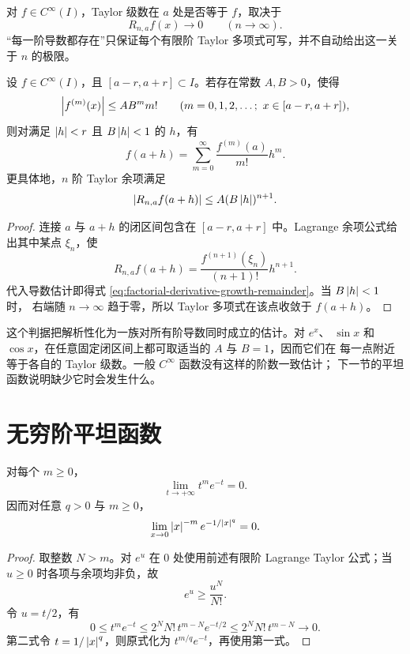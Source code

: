 对 \(f\in C^\infty(I)\)，Taylor 级数在 \(a\) 处是否等于 \(f\)，取决于
\[
 R_{n,a}f(x)\longrightarrow0\qquad(n\to\infty).
\]
“每一阶导数都存在”只保证每个有限阶 Taylor 多项式可写，并不自动给出这一关于 \(n\) 的极限。

\begin{theorem}[导数增长与解析性]
\label{thm:derivative-growth-analyticity}
设 \(f\in C^\infty(I)\)，且 \([a-r,a+r]\subset I\)。若存在常数 \(A,B>0\)，使得
\[
 \left|f^{(m)}(x)\right|\le A B^m m!
 \qquad(m=0,1,2,\ldots;\ x\in[a-r,a+r]),
\]
则对满足 \(\left|h\right|<r\) 且 \(B\left|h\right|<1\) 的 \(h\)，有
\[
 f(a+h)=\sum_{m=0}^{\infty}\frac{f^{(m)}(a)}{m!}h^m.
\]
更具体地，\(n\) 阶 Taylor 余项满足
\begin{equation}
 \left|R_{n,a}f(a+h)\right|\le A(B\left|h\right|)^{n+1}.
 \label{eq:factorial-derivative-growth-remainder}
\end{equation}
\end{theorem}

\begin{proof}
连接 \(a\) 与 \(a+h\) 的闭区间包含在 \([a-r,a+r]\) 中。Lagrange 余项公式给出其中某点
\(\xi_n\)，使
\[
 R_{n,a}f(a+h)=\frac{f^{(n+1)}(\xi_n)}{(n+1)!}h^{n+1}.
\]
代入导数估计即得式 \eqref{eq:factorial-derivative-growth-remainder}。当 \(B\left|h\right|<1\) 时，
右端随 \(n\to\infty\) 趋于零，所以 Taylor 多项式在该点收敛于 \(f(a+h)\)。
\end{proof}

这个判据把解析性化为一族对所有阶导数同时成立的估计。对 \(e^x\)、
\(\sin x\) 和 \(\cos x\)，在任意固定闭区间上都可取适当的 \(A\) 与 \(B=1\)，因而它们在
每一点附近等于各自的 Taylor 级数。一般 \(C^\infty\) 函数没有这样的阶数一致估计；
下一节的平坦函数说明缺少它时会发生什么。

\section{无穷阶平坦函数}

\begin{lemma}[指数压过任意幂]
对每个 \(m\ge0\)，
\[
 \lim_{t\to+\infty}t^m e^{-t}=0.
\]
因而对任意 \(q>0\) 与 \(m\ge0\)，
\[
 \lim_{x\to0}\left|x\right|^{-m}e^{-1/\left|x\right|^{q}}=0.
\]
\end{lemma}

\begin{proof}
取整数 \(N>m\)。对 \(e^u\) 在 \(0\) 处使用前述有限阶 Lagrange Taylor 公式；当 \(u\ge0\) 时各项与余项均非负，故
\[
 e^u\ge\frac{u^N}{N!}.
\]
令 \(u=t/2\)，有
\[
 0\le t^m e^{-t}
 \le 2^N N!\,t^{m-N}e^{-t/2}
 \le 2^N N!\,t^{m-N}\longrightarrow0.
\]
第二式令 \(t=1/\left|x\right|^{q}\)，则原式化为 \(t^{m/q}e^{-t}\)，再使用第一式。
\end{proof}

